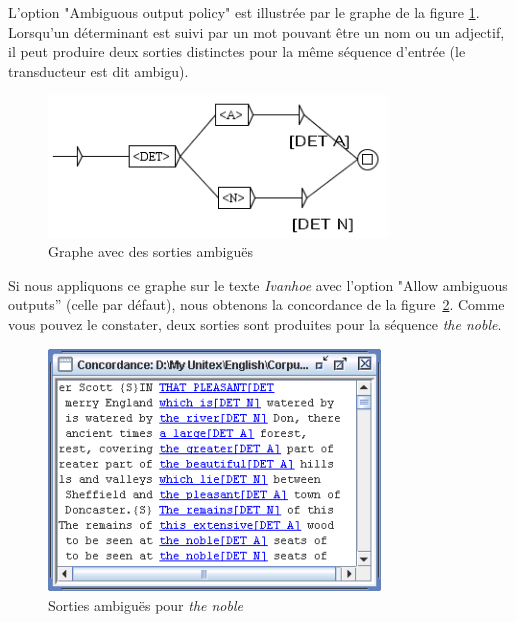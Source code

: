 \bigskip
{}
\noindent L'option "Ambiguous output policy" est illustrée par le graphe de la 
figure \ref{fig6-advanced-options2}. Lorsqu'un déterminant est suivi par un mot pouvant être un
nom ou un adjectif, il peut produire deux sorties distinctes pour la même séquence d'entrée
(le transducteur est dit ambigu).

\bigskip
\begin{figure}[!h]
\begin{center}
\includegraphics[width=9cm]{resources/img/fig6-advanced-options2.png}
\caption{Graphe avec des sorties ambiguës\label{fig6-advanced-options2}}
\end{center}
\end{figure}

\noindent Si nous appliquons ce graphe sur le texte \textit{Ivanhoe} avec l'option "Allow ambiguous outputs''
(celle par défaut), nous obtenons la concordance de la figure~\ref{fig6-advanced-options3}. Comme vous pouvez le constater, deux sorties sont produites pour la séquence \textit{the noble}.

\bigskip
\begin{figure}[!h]
\begin{center}
\includegraphics[width=8.8cm]{resources/img/fig6-advanced-options3.png}
\caption{Sorties ambiguës pour \textit{the noble}\label{fig6-advanced-options3}}
\end{center}
\end{figure}

